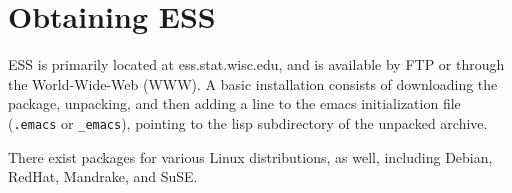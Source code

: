 \documentclass{article}
\begin{document}






\section{Obtaining ESS}
\label{sec:getIt}

ESS is primarily located at ess.stat.wisc.edu, and is available by FTP
or through the World-Wide-Web (WWW).  A basic installation consists of
downloading the package, unpacking, and then adding a line to the
emacs initialization file (\verb+.emacs+ or \verb+_emacs+), pointing
to the lisp subdirectory of the unpacked archive.

There exist packages for various Linux distributions, as well,
including Debian, RedHat, Mandrake, and SuSE.
\end{document}
